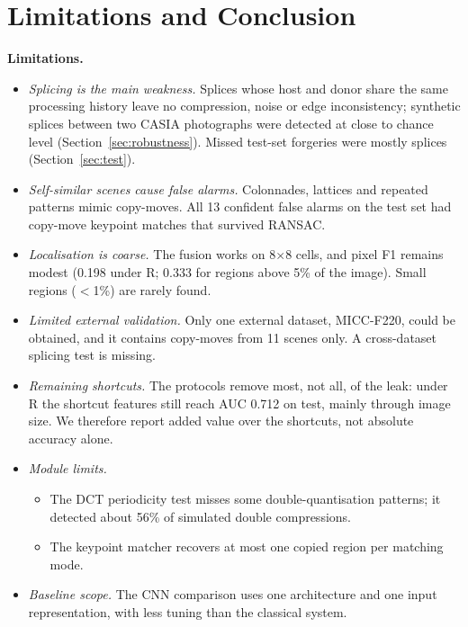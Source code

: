 \section{Limitations and Conclusion}\label{sec:conclusion}

\textbf{Limitations.}
\begin{itemize}\setlength\itemsep{0pt}
\item \emph{Splicing is the main weakness.} Splices whose host and donor share the same processing history leave
no compression, noise or edge inconsistency; synthetic splices between two CASIA photographs were detected at
close to chance level (Section~\ref{sec:robustness}). Missed test-set forgeries were mostly splices
(Section~\ref{sec:test}).
\item \emph{Self-similar scenes cause false alarms.} Colonnades, lattices and repeated patterns mimic copy-moves.
All 13 confident false alarms on the test set had copy-move keypoint matches that survived RANSAC.
\item \emph{Localisation is coarse.} The fusion works on 8$\times$8 cells, and pixel F1 remains modest (0.198
under R; 0.333 for regions above 5\% of the image). Small regions ($<$1\%) are rarely found.
\item \emph{Limited external validation.} Only one external dataset, MICC-F220, could be obtained, and it contains
copy-moves from 11 scenes only. A cross-dataset splicing test is missing.
\item \emph{Remaining shortcuts.} The protocols remove most, not all, of the leak: under R the shortcut features
still reach AUC 0.712 on test, mainly through image size. We therefore report added value over the shortcuts, not
absolute accuracy alone.
\item \emph{Module limits.}
  \begin{itemize}\setlength\itemsep{0pt}
  \item The DCT periodicity test misses some double-quantisation patterns; it detected about 56\% of simulated
  double compressions.
  \item The keypoint matcher recovers at most one copied region per matching mode.
  \end{itemize}
\item \emph{Baseline scope.} The CNN comparison uses one architecture and one input representation, with less
tuning than the classical system.
\end{itemize}

